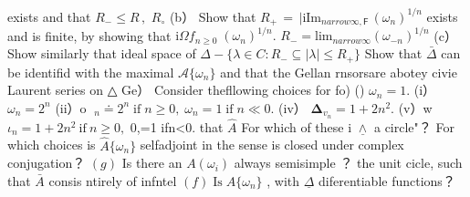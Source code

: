 exists and that $R_{-}\leq R\,,$ $\scriptstyle{R_{\circ}}$ (b） Show that $R_{+}\,=\,\vert\mathrm{i}\mathrm{Im}_{n arrow\infty,\mathsf{F}}\,(\omega_{n})^{1/n}$ exists and is finite, by showing that $\mathrm{i}\Omega f_{n\ge0}\;(\omega_{n})^{1/n}.$ $R_{-}=\mathrm{lim}_{n arrow\infty}(\omega_{-n})^{1/n}$ (c） Show similarly that ideal space of $\Delta-\{\lambda\in C\colon R_{-}\subseteq|\lambda|\leq R_{+}\}$ Show that $\bar{\Delta}$ can be identifid with the maximal ${\mathcal{A}}\{\omega_{n}\}$ and that the Gellan rnsorsare abotey civie Laurent series on △ Ge） Consider thefllowing choices for fo) () $\omega_{n}=1.$ (i） $\omega_{n}=2^{n}$ (ii）o $\;_{n}\doteq2^{n}\;\mathrm{i}\mathrm{f}\;n\geq0,\;\omega_{n}=1\;\mathrm{i}\mathrm{f}\;n\ll0.$ (iv） $\mathbf{\Delta}_{v_{n}}=1+2n^{2}.$ (v）w $\iota_{n}=1+2n^{2}{\mathrm{~if~}}n\geq0,$ 0,=1 ifn<0. that $\hat{A}$ For which of these i $\underline{{\land}}$ a circle"？ For which choices is ${\hat{A}}\{\omega_{n}\}$ selfadjoint in the sense is closed under complex conjugation？ $(g)$ Is there an $\scriptstyle A(\omega_{i})$ always semisimple ？ the unit cicle, such that $\bar{A}$ consis ntirely of infntel $(f)\operatorname{Is}A\{\omega_{n}\}$ , with $\underline{{\Delta}}$ diferentiable functions？